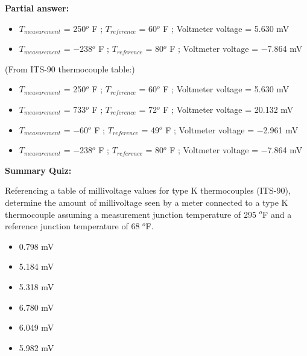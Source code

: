\noindent
{\bf Partial answer:}

\begin{itemize}
\item{} $T_{measurement}$ = 250$^{o}$ F ; $T_{reference}$ = 60$^{o}$ F ; Voltmeter voltage = 5.630 mV 
\item{} $T_{measurement}$ = $-$238$^{o}$ F ; $T_{reference}$ = 80$^{o}$ F ; Voltmeter voltage = $-$7.864 mV
\end{itemize}







(From ITS-90 thermocouple table:)

\begin{itemize}
\item{} $T_{measurement}$ = 250$^{o}$ F ; $T_{reference}$ = 60$^{o}$ F ; Voltmeter voltage = 5.630 mV 
\item{} $T_{measurement}$ = 733$^{o}$ F ; $T_{reference}$ = 72$^{o}$ F ; Voltmeter voltage = 20.132 mV 
\item{} $T_{measurement}$ = $-$60$^{o}$ F ; $T_{reference}$ = 49$^{o}$ F ; Voltmeter voltage = $-$2.961 mV
\item{} $T_{measurement}$ = $-$238$^{o}$ F ; $T_{reference}$ = 80$^{o}$ F ; Voltmeter voltage = $-$7.864 mV
\end{itemize}





\vfil \eject

\noindent
{\bf Summary Quiz:}

Referencing a table of millivoltage values for type K thermocouples (ITS-90), determine the amount of millivoltage seen by a meter connected to a type K thermocouple assuming a measurement junction temperature of 295 $^{o}$F and a reference junction temperature of 68 $^{o}$F.

\begin{itemize}
\item{} 0.798 mV
\vskip 5pt 
\item{} 5.184 mV
\vskip 5pt 
\item{} 5.318 mV
\vskip 5pt 
\item{} 6.780 mV
\vskip 5pt 
\item{} 6.049 mV
\vskip 5pt 
\item{} 5.982 mV
\end{itemize}





